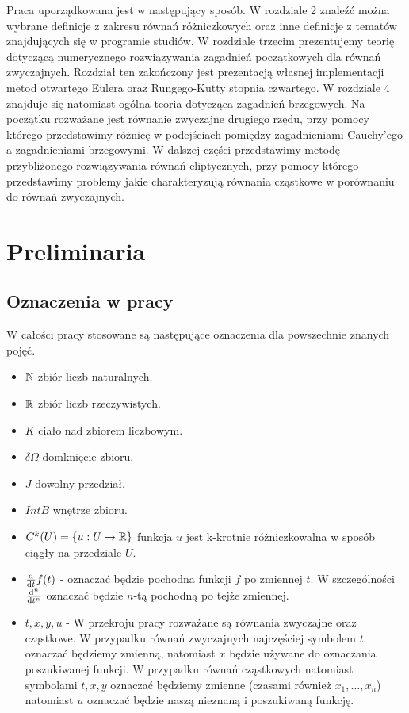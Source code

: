 \documentclass[12pt,a4paper]{report}
\begin{document}
Praca uporządkowana jest w następujący sposób. W rozdziale 2 znaleźć można wybrane definicje z zakresu równań różniczkowych oraz inne definicje z tematów znajdujących się w programie studiów. W rozdziale trzecim prezentujemy teorię dotyczącą numerycznego rozwiązywania zagadnień początkowych dla równań zwyczajnych. Rozdział ten zakończony jest prezentacją własnej implementacji metod otwartego Eulera oraz Rungego-Kutty stopnia czwartego. W rozdziale 4 znajduje się natomiast ogólna teoria dotycząca zagadnień brzegowych. Na początku rozważane jest równanie zwyczajne drugiego rzędu, przy pomocy którego przedstawimy różnicę w podejściach pomiędzy zagadnieniami Cauchy'ego a zagadnieniami brzegowymi. W dalszej części przedstawimy metodę przybliżonego rozwiązywania równań eliptycznych, przy pomocy którego przedstawimy problemy jakie charakteryzują równania cząstkowe w porównaniu do równań zwyczajnych. 

\chapter{Preliminaria}

\section{Oznaczenia w pracy}

W całości pracy stosowane są następujące oznaczenia dla powszechnie znanych pojęć.
\begin{itemize}
\item $\setN$ zbiór liczb naturalnych.
\item $\setR$ zbiór liczb rzeczywistych.
\item $K$ ciało nad zbiorem liczbowym.
\item $\delta \Omega $ domknięcie zbioru.
\item $J$ dowolny przedział.
\item $IntB$ wnętrze zbioru.
\item $C^k(U) = \set{u: U \to \setR} $ funkcja $u$ jest k-krotnie różniczkowalna w sposób ciągły na przedziale $U$. 
\item $\ddx{t} f(t)$ - oznaczać będzie pochodna funkcji $f$ po zmiennej $t$. W szczególności $\ddx[^n]{t^n}$ oznaczać będzie $n$-tą pochodną po tejże zmiennej.
\item $t, x, y, u$ - W przekroju pracy rozważane są równania zwyczajne oraz cząstkowe. W przypadku równań zwyczajnych najczęściej symbolem $t$ oznaczać będziemy zmienną, natomiast $x$ będzie używane do oznaczania poszukiwanej funkcji. W przypadku równań cząstkowych natomiast symbolami $t,x,y$ oznaczać będziemy zmienne (czasami również $x_1,\ldots,x_n$) natomiast $u$ oznaczać będzie naszą nieznaną i poszukiwaną funkcję.
\end{itemize}
\end{document}
